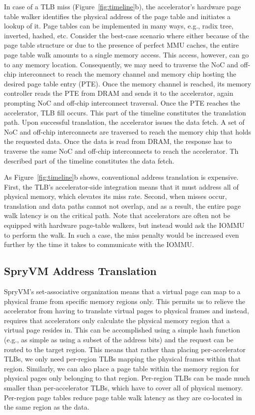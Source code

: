 In case of a TLB miss (Figure~\ref{fig:timeline}b),  the accelerator's hardware page table walker
identifies the physical address of the page table and initiates a
lookup of it. Page tables can be implemented in many ways, e.g., radix
tree, inverted, hashed, etc. Consider the best-case scenario where either
because of the page table structure or due to the presence of perfect MMU caches, the entire page
table walk amounts to a single memory access\cite{bhattacharjee:large-reach, barr:translation}. This access, however, can 
go to any memory location. Consequently, we may
need to traverse the NoC and off-chip interconnect to reach the
memory channel and memory chip hosting the desired page table entry (PTE). Once the memory
channel is reached, its memory controller reads the PTE from DRAM and sends it to the accelerator, again prompting NoC and
off-chip interconnect traversal. Once the PTE reaches the accelerator, TLB fill occurs. This part of the timeline
constitutes the translation path. Upon successful translation, the accelerator issues the data fetch. A set of NoC and off-chip
interconnects are traversed to reach the memory chip that holds
the requested data. Once the data is read from DRAM, the response has to traverse the same
NoC and off-chip interconnects to reach the accelerator. Th described part of the timeline constitutes the data fetch.

As Figure~\ref{fig:timeline}b shows, conventional address
translation is expensive. First, the TLB's accelerator-side
integration means that it must address all of physical memory, which
elevates its miss rate. Second, when misses occur,
translation and data paths cannot not overlap, and as a result, the entire page walk
latency is on the critical path. Note that accelerators are often not be equipped with hardware page-table walkers, but instead would
ask the IOMMU to perform the walk. In such a case, the miss penalty would be increased even further by the time it takes to communicate with the IOMMU.

\subsection{SpryVM Address Translation}
SpryVM's set-associative organization means that a virtual page can
map to a physical frame from specific memory regions only. This
permits us to relieve the accelerator from having to translate virtual
pages to physical frames and instead, requires that accelerators only
calculate the physical memory region that a virtual page resides in. 
This can be accomplished using a simple hash function (e.g., as simple as using
a subset of the address bits) and the request can be routed to the target region. This means that rather than
placing per-accelerator TLBs, we only need per-region TLBs mapping the
physical frames within that region. Similarly, we can also place a
page table within the memory region for physical pages only belonging
to that region. Per-region TLBs can be made much smaller than
per-accelerator TLBs, which have to cover all of physical
memory. Per-region page tables reduce page table walk latency as
they are co-located in the same region as the data.

